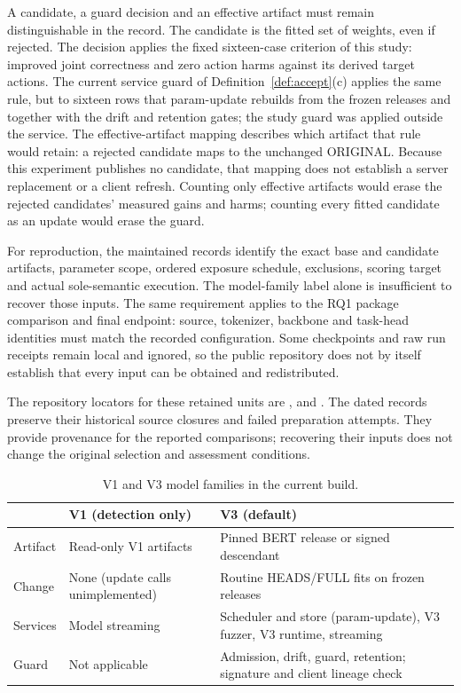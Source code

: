 \documentclass[sigconf]{acmart}
\theoremstyle{acmdefinition}\newtheorem{property}{Property}
\begin{document}
A candidate, a guard decision and an effective artifact must remain distinguishable in the record. The candidate is the fitted set of weights, even if rejected. The decision applies the fixed sixteen-case criterion of this study: improved joint correctness and zero action harms against its derived target actions. The current service guard of Definition~\ref{def:accept}(c) applies the same rule, but to sixteen rows that param-update rebuilds from the frozen releases and together with the drift and retention gates; the study guard was applied outside the service. The effective-artifact mapping describes which artifact that rule would retain: a rejected candidate maps to the unchanged ORIGINAL. Because this experiment publishes no candidate, that mapping does not establish a server replacement or a client refresh. Counting only effective artifacts would erase the rejected candidates' measured gains and harms; counting every fitted candidate as an update would erase the guard.

For reproduction, the maintained records identify the exact base and candidate artifacts, parameter scope, ordered exposure schedule, exclusions, scoring target and actual sole-semantic execution. The model-family label alone is insufficient to recover those inputs. The same requirement applies to the RQ1 package comparison and final endpoint: source, tokenizer, backbone and task-head identities must match the recorded configuration. Some checkpoints and raw run receipts remain local and ignored, so the public repository does not by itself establish that every input can be obtained and redistributed.

The repository locators for these retained units are ,  and . The dated records preserve their historical source closures and failed preparation attempts. They provide provenance for the reported comparisons; recovering their inputs does not change the original selection and assessment conditions.

\begin{table}[!t]
\centering
\caption{V1 and V3 model families in the current build.}
\label{tab:paths}
\small
\begin{tabular}{p{}p{}p{}}
\toprule
 & V1 (detection only) & V3 (default) \\
\midrule
Artifact & Read-only V1 artifacts & Pinned BERT release or signed descendant \\
Change & None (update calls unimplemented) & Routine HEADS/FULL fits on frozen releases \\
Services & Model streaming & Scheduler and store (param-update), V3 fuzzer, V3 runtime, streaming \\
Guard & Not applicable & Admission, drift, guard, retention; signature and client lineage check \\
\bottomrule
\end{tabular}
\end{table}
\end{document}
